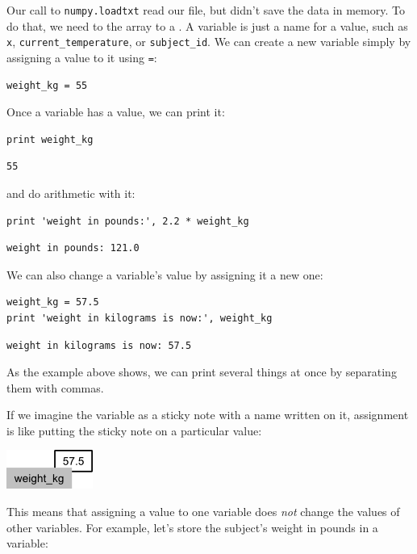 \documentclass{book}
\begin{document}
Our call to \texttt{numpy.loadtxt} read our file, but didn't save the
data in memory. To do that, we need to 
the array to a . A variable is just a
name for a value, such as \texttt{x}, \texttt{current\_temperature}, or
\texttt{subject\_id}. We can create a new variable simply by assigning a
value to it using \texttt{=}:

\begin{verbatim}
weight_kg = 55
\end{verbatim}

Once a variable has a value, we can print it:

\begin{verbatim}
print weight_kg
\end{verbatim}

\begin{verbatim}
55
\end{verbatim}

and do arithmetic with it:

\begin{verbatim}
print 'weight in pounds:', 2.2 * weight_kg
\end{verbatim}

\begin{verbatim}
weight in pounds: 121.0
\end{verbatim}

We can also change a variable's value by assigning it a new one:

\begin{verbatim}
weight_kg = 57.5
print 'weight in kilograms is now:', weight_kg
\end{verbatim}

\begin{verbatim}
weight in kilograms is now: 57.5
\end{verbatim}

As the example above shows, we can print several things at once by
separating them with commas.

If we imagine the variable as a sticky note with a name written on it,
assignment is like putting the sticky note on a particular value:

\includegraphics{novice/python/img/python-sticky-note-variables-01.png}

This means that assigning a value to one variable does \emph{not} change
the values of other variables. For example, let's store the subject's
weight in pounds in a variable:
\end{document}
